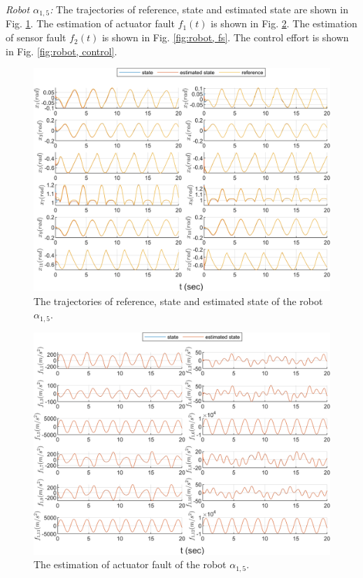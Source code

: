 \documentclass{ieeeaccess}
\begin{document}
\textit{Robot $\alpha_{1,5}$:}
The trajectories of reference, state and estimated state are shown in Fig. \ref{fig:robot, state}. The estimation of actuator fault $f_1(t)$ is shown in Fig. \ref{fig:robot, fa}. The estimation of sensor fault $f_2(t)$ is shown in Fig. \ref{fig:robot, fs}. The control effort is shown in Fig. \ref{fig:robot, control}.
\begin{figure}[htbp]
    \centering
    \includegraphics[scale=.57]{fig/robot (1).png}\caption{The trajectories of reference, state and estimated state of the robot $\alpha_{1,5}$.}%
    \label{fig:robot, state}
\end{figure}
\begin{figure}[htbp]
    \centering
    \includegraphics[scale=.57]{fig/robot (2).png}\caption{The estimation of actuator fault of the robot $\alpha_{1,5}$.}%
    \label{fig:robot, fa}
\end{figure}
\end{document}
